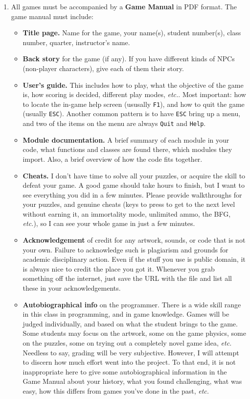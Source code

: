 \documentclass{article}
\begin{document}
\begin{enumerate}
\item All games must be accompanied by a {\bf Game Manual} in PDF format.
  The game
  manual must include:
  \begin{itemize}
\item {\bf Title page.}
  Name for the game, your name(s), student number(s), 
  class number, quarter,
  instructor's name.
\item {\bf Back story} for the game (if any).  If you have different
  kinds of NPCs (non-player characters), give each of them their
  story.
\item {\bf User's guide.}
  This includes how to play, what the objective of the game is, how
  scoring is decided, different play modes, {\em etc.}.  Most
  important: how to locate the in-game help
  screen (ususally {\tt F1}), and how to quit the game (usually
  {\tt ESC}).  Another common pattern is to have {\tt ESC} bring
  up a menu, and two of the items on the menu are always {\tt Quit}
  and {\tt Help}.
\item {\bf Module documentation.}  A brief summary of each module in your
  code, what functions and classes are found there, which modules they
  import.  Also, a brief overview of how the code fits together.
\item {\bf Cheats.}  I don't have time to solve all your puzzles, or
  acquire the skill to defeat your game.  A good game should take
  hours to finish, but I want to see everything you did in a few
  minutes.  Please provide walkthroughs for your puzzles, and
  genuine cheats (keys to press to get to the next level without
  earning it, an immortality mode, unlimited ammo, the BFG,
  {\em etc.}), so I can see your
  whole game in just a few
  minutes.
\item {\bf Acknowledgement} of credit for any artwork, sounds, or code that
  is not your own.
  Failure to acknowledge such is plagiarism and grounds for academic
  disciplinary action.  Even if the stuff you use is public domain, it
  is always nice to credit the place you got it.  Whenever you grab
  something off the internet, just save the URL with the file and list
  all these in your acknowledgements.
\item {\bf Autobiographical info} on the programmer.
  There is a wide skill range in this class in programming, and in
  game knowledge.  Games will be judged individually, and based on
  what the student brings to the game.  Some students may focus on the
  artwork, some on the game physics, some on the puzzles, some on
  trying out a completely novel game idea, {\em etc.}  Needless to
  say, grading will be very subjective.  However, I will attempt to
  discern how much effort went into the project.  To that end, it is
  not inappropriate here to give some autobiographical information in
  the Game Manual about your history, what you found challenging, what
  was easy, how this differs from games you've done in the past, {\em
    etc.}
  \end{itemize}


\end{enumerate}
\end{document}
